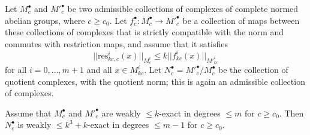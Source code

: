 \begin{proposition}
  \label{weaksnakelemma}
  \leanok
  Let $M^\bullet_c$ and $M'^\bullet_c$ be two admissible collections
  of complexes of complete normed abelian groups, where $c\geq c_0$.
  Let $f^\bullet_c: M^\bullet_c\to M'^\bullet_c$ be a collection of maps
  between these collections of complexes
  that is strictly compatible with the norm and commutes with restriction maps,
  and assume that it satisfies
  \[
  ||\mathrm{res}^i_{kc,c}(x)||_{M^i_c}\leq k||f^i_{kc}(x)||_{M'^i_{kc}}
  \]
  for all $i=0,\ldots,m+1$ and all $x\in M^i_{kc}$.
  Let $N^\bullet_c=M'^\bullet_c/M^\bullet_c$
  be the collection of quotient complexes, with the quotient norm;
  this is again an admissible collection of complexes.

  Assume that $M^\bullet_c$ and $M'^\bullet_c$ are weakly $\leq k$-exact in degrees $\leq m$ for $c\geq c_0$.
  Then $N^\bullet_c$ is weakly $\leq k^3+k$-exact in degrees $\leq m-1$ for $c\geq c_0$.
\end{proposition}

